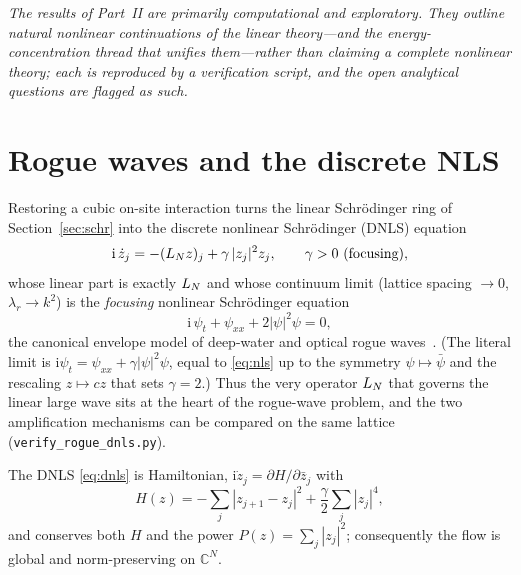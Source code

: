 
\noindent\emph{The results of Part~II are primarily computational and exploratory. They outline natural
nonlinear continuations of the linear theory---and the energy-concentration thread that unifies
them---rather than claiming a complete nonlinear theory; each is reproduced by a verification script,
and the open analytical questions are flagged as such.}

\section{Rogue waves and the discrete NLS}\label{sec:rogue}

Restoring a cubic on-site interaction turns the linear Schr\"odinger ring of Section~\ref{sec:schr}
into the discrete nonlinear Schr\"odinger (DNLS) equation
\begin{equation}\label{eq:dnls}
  \mathrm i\,\dot z_j = -(L_N z)_j + \gamma\,|z_j|^2 z_j,\qquad \gamma>0\ \text{(focusing)},
\end{equation}
whose linear part is exactly $L_N$ and whose continuum limit (lattice spacing $\to0$, $\lambda_r\to k^2$)
is the \emph{focusing} nonlinear Schr\"odinger equation
\begin{equation}\label{eq:nls}
  \mathrm i\,\psi_t + \psi_{xx} + 2|\psi|^2\psi = 0,
\end{equation}
the canonical envelope model of deep-water and optical rogue waves~\cite{Zakharov,KharifPelinovsky,Onorato,Solli}.
(The literal limit is $\mathrm i\psi_t=\psi_{xx}+\gamma|\psi|^2\psi$, equal to \eqref{eq:nls} up to the
symmetry $\psi\mapsto\bar\psi$ and the rescaling $z\mapsto cz$ that sets $\gamma=2$.) Thus the very operator $L_N$ that
governs the linear large wave sits at the heart of the rogue-wave problem, and the two amplification
mechanisms can be compared on the same lattice (\texttt{verify\_rogue\_dnls.py}).

\begin{proposition}\label{prop:dnls-cons}
The DNLS \eqref{eq:dnls} is Hamiltonian, $\mathrm i\dot z_j=\partial H/\partial\bar z_j$ with
\[
  H(z)=-\sum_j|z_{j+1}-z_j|^2+\frac\gamma2\sum_j|z_j|^4,
\]
and conserves both $H$ and the power $P(z)=\sum_j|z_j|^2$; consequently the flow is global and
norm-preserving on $\mathbb C^N$.
\end{proposition}


